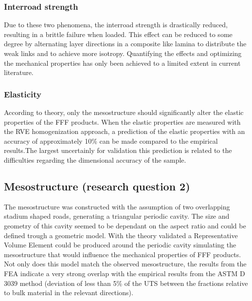 \subsubsection{Interroad strength} 
Due to these two phenomena, the interroad strength is drastically reduced, resulting in a brittle failure when loaded. This effect can be reduced to some degree by alternating layer directions in a composite like lamina to distribute the weak links and to achieve more isotropy. 
Quantifying the effects and optimizing the mechanical properties has only been achieved to a limited extent in current literature. 
\subsubsection{Elasticity} 
According to theory, only the mesostructure should significantly alter the elastic properties of the FFF products. When the elastic properties are measured with the RVE homogenization approach, a prediction of the elastic properties with an accuracy of approximately 10\% can be made compared to the empirical results.The largest uncertainly for validation this prediction is related to the difficulties regarding the dimensional accuracy of the sample.

\subsection{Mesostructure (research question 2)}
The mesostructure was constructed with the assumption of two overlapping stadium shaped roads, generating a triangular periodic cavity. The size and geometry of this cavity seemed to be dependant on the aspect ratio and could be defined trough a geometric model. With the theory validated a Representative Volume Element could be produced around the periodic cavity simulating the mesostructure that would influence the mechanical properties of FFF products. Not only does this model match the observed mesostructure, the results from the FEA indicate a very strong overlap with the empirical results from the ASTM D 3039 method (deviation of less than 5\% of the UTS between the fractions relative to bulk material in the relevant directions). 

